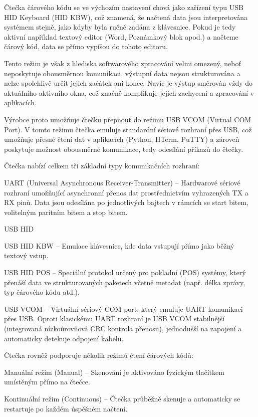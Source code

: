 Čtečka čárového kódu se ve výchozím nastavení chová jako zařízení typu USB HID Keyboard (HID KBW), což znamená, že načtená data jsou interpretována systémem stejně, jako kdyby byla ručně zadána z klávesnice. Pokud je tedy aktivní například textový editor (Word, Poznámkový blok apod.) a načteme čárový kód, data se přímo vypíšou do tohoto editoru.

Tento režim je však z hlediska softwarového zpracování velmi omezený, neboť neposkytuje obousměrnou komunikaci, výstupní data nejsou strukturována a nelze spolehlivě určit jejich začátek ani konec. Navíc je výstup směrován vždy do aktuálního aktivního okna, což značně komplikuje jejich zachycení a zpracování v aplikacích.

Výrobce proto umožňuje čtečku přepnout do režimu USB VCOM (Virtual COM Port). V tomto režimu čtečka emuluje standardní sériové rozhraní přes USB, což umožňuje přesné čtení dat v aplikacích (Python, HTerm, PuTTY) a zároveň poskytuje možnost obousměrné komunikace, tedy odesílání příkazů do čtečky.

Čtečka nabízí celkem tři základní typy komunikačních rozhraní:

    UART (Universal Asynchronous Receiver-Transmitter) – Hardwarové sériové rozhraní umožňující asynchronní přenos dat prostřednictvím vyhrazených TX a RX pinů. Data jsou odesílána po jednotlivých bajtech v rámcích se start bitem, volitelným paritním bitem a stop bitem.

    USB HID

        USB HID KBW – Emulace klávesnice, kde data vstupují přímo jako běžný textový vstup.

        USB HID POS – Speciální protokol určený pro pokladní (POS) systémy, který přenáší data ve strukturovaných paketech včetně metadat (např. délka zprávy, typ čárového kódu atd.).

    USB VCOM – Virtuální sériový COM port, který emuluje UART komunikaci přes USB. Oproti klasickému UART rozhraní je USB VCOM stabilnější (integrovaná nízkoúrovňová CRC kontrola přenosu), jednodušší na zapojení a automaticky detekuje odpojení kabelu.

Čtečka rovněž podporuje několik režimů čtení čárových kódů:

    Manuální režim (Manual) – Skenování je aktivováno fyzickým tlačítkem umístěným přímo na čtečce.

    Kontinuální režim (Continuous) – Čtečka průběžně skenuje a automaticky se restartuje po každém úspěšném načtení.

